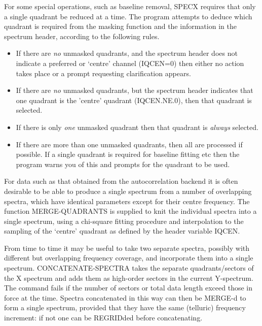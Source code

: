 \documentclass[11pt,twoside]{report}
\begin{document}
For some special operations, such as baseline removal, 
SPECX requires that only a single quadrant be reduced
at a time. The program attempts to deduce which quadrant is required from the
masking function and the information in the spectrum header, according to the
following rules.
\begin{itemize}
\item If there are {\em no} unmasked quadrants, and the spectrum header does
not indicate a preferred or `centre' channel (IQCEN=0)  then
either no action takes place or a prompt requesting clarification appears.
\item If there are {\em no} unmasked quadrants, but the spectrum header
indicates that one quadrant is the 'centre' quadrant (IQCEN.NE.0), then that
quadrant is selected.
\item If there is only {\em one} unmasked quadrant then that quadrant is
{\em always} selected.
\item If there are more than one unmasked quadrants, then all are processed if
possible. If a single quadrant is required for baseline fitting etc then
the program warns you of this and prompts for the quadrant to be used.
\end{itemize}

For data such as that obtained from the autocorrelation backend
 it is often desirable to be able to produce a single
spectrum from a number of overlapping spectra, which have identical parameters
except for their centre frequency. The function MERGE-QUADRANTS is supplied to
knit  the individual spectra into a single spectrum,
using a chi-square fitting procedure and interpolation to the sampling of the
`centre' quadrant as defined by the header variable IQCEN. 

From time to time it may be useful to take two separate spectra, possibly
with different but overlapping frequency coverage, and incorporate them into
a single spectrum. CONCATENATE-SPECTRA takes the separate quadrants/sectors
of the X spectrum and adds them as high-order sectors in the current Y-spectrum.
The command fails if the number of sectors or total data length exceed those in
force at the time. Spectra concatenated in this way can then be MERGE-d
 to form a single spectrum, provided that they have the
same (telluric) frequency increment: if not one can be REGRIDded
 before concatenating.
\end{document}

